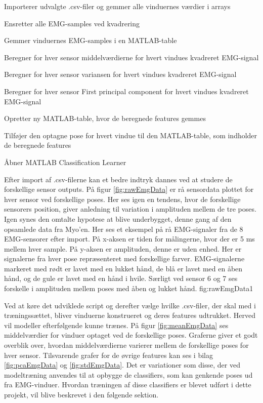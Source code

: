 \begin{myItemize}
\item Importerer udvalgte .csv-filer og gemmer alle vinduernes værdier i arrays
\item Ensretter alle EMG-samples ved kvadrering 
\item Gemmer vinduernes EMG-samples i en MATLAB-table
\item Beregner for hver sensor middelværdierne for hvert vindues kvadreret EMG-signal
\item Beregner  for hver sensor variansen for hvert vindues kvadreret EMG-signal
\item Beregner  for hver sensor First principal component for hvert vindues kvadreret EMG-signal
\item Opretter ny MATLAB-table, hvor de beregnede features gemmes
\item Tilføjer den optagne pose for hvert vindue til den MATLAB-table, som indholder de beregnede features
\item Åbner MATLAB Classification Learner\citep{matlabClassificationLearner}
\end{myItemize}
Efter import af .csv-filerne kan et bedre indtryk dannes ved at studere de forskellige sensor outputs. På figur \ref{fig:rawEmgData} er rå sensordata plottet for hver sensor ved forskellige poses. Her ses igen en tendens, hvor de forskellige sensorers position, giver anledning til variation i amplituden mellem de tre poses. Igen synes den omtalte hypotese at blive underbygget, denne gang af den opsamlede data fra Myo'en.
{
	Her ses et eksempel på rå EMG-signaler fra de 8 EMG-sensorer efter import. På x-aksen er tiden for målingerne, hvor der er 5 ms mellem hver sample. På y-aksen er amplituden, denne er uden enhed. Her er signalerne fra hver pose repræsenteret med forskellige farver. EMG-signalerne markeret med rødt er lavet med en lukket hånd, de blå er lavet med en åben hånd, og de gule er lavet med en hånd i hvile. Særligt ved sensor 6 og 7 ses forskelle i amplituden mellem poses med åben og lukket hånd. 
 }{fig:rawEmgData}{1}
 
Ved at køre det udviklede script og derefter vælge hvilke .csv-filer, der skal med i træningssættet, bliver vinduerne konstrueret og deres features udtrukket. Herved vil modeller efterfølgende kunne trænes. På figur \ref{fig:meanEmgData} ses middelværdier for vinduer optaget ved de forskellige poses. Graferne giver et godt overblik over, hvordan middelværdierne varierer mellem de forskellige poses for hver sensor. Tilsvarende grafer for de øvrige features kan ses i bilag \ref{fig:pcaEmgData} og \ref{fig:stdEmgData}. Det er variationer som disse, der ved modeltræning anvendes til at opbygge de classifiers, som kan genkende poses ud fra EMG-vinduer. Hvordan træningen af disse classifiers er blevet udført i dette projekt, vil blive beskrevet i den følgende sektion.

